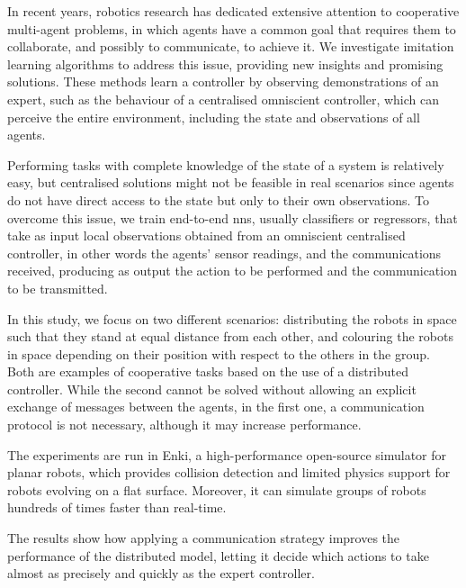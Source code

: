 In recent years, robotics research has dedicated extensive attention to cooperative 
multi-agent problems, in which agents have a common goal that requires them to 
collaborate, and possibly to communicate, to achieve it.
We investigate imitation learning algorithms to address this issue, providing new 
insights and promising solutions. 
These methods learn a controller by observing demonstrations of an expert, such 
as the behaviour of a centralised omniscient controller, which can perceive the 
entire environment, including the state and observations of all agents. 

Performing tasks with complete knowledge of the state of a system is relatively 
easy, but centralised solutions might not be feasible in real scenarios since agents 
do not have direct access to the state but only to their own observations.
To overcome this issue, we train end-to-end \glspl{nn}, usually classifiers or 
regressors, that take as input local observations obtained from an omniscient 
centralised controller, in other words the agents' sensor readings, and the 
communications received, producing as output the action to be performed and 
the communication to be transmitted.

In this study, we focus on two different scenarios: distributing the robots in space 
such that they stand at equal distance from each other, and colouring the robots 
in space depending on their position with respect to the others in the group.
Both are examples of cooperative tasks based on the use of a distributed 
controller. While the second cannot be solved without allowing an explicit 
exchange of messages between the agents, in the first one, a communication 
protocol is not necessary, although it may increase performance.

The experiments are run in Enki, a high-performance open-source simulator for 
planar robots, which provides collision detection and limited physics support for 
robots evolving on a flat surface. Moreover, it can simulate groups of robots 
hundreds of times faster than real-time.


The results show how applying a communication strategy improves the 
performance of the distributed model, letting it decide which actions to take 
almost as precisely and quickly as the expert controller.